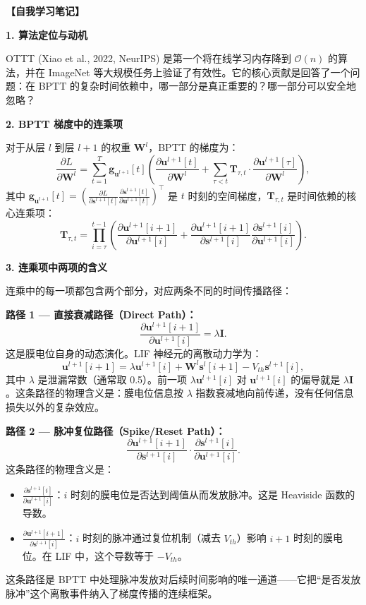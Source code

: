 \documentclass[journal,12pt,onecolumn]{IEEEtran}
\begin{document}
\bigskip\noindent\textbf{【自我学习笔记】}

\medskip\noindent\textbf{1. 算法定位与动机}

OTTT (Xiao et al., 2022, NeurIPS) 是第一个将在线学习内存降到 $\mathcal{O}(n)$ 的算法，并在 ImageNet 等大规模任务上验证了有效性。它的核心贡献是回答了一个问题：在 BPTT 的复杂时间依赖中，哪一部分是真正重要的？哪一部分可以安全地忽略？

\medskip\noindent\textbf{2. BPTT 梯度中的连乘项}

对于从层 $l$ 到层 $l+1$ 的权重 $\mathbf{W}^l$，BPTT 的梯度为：
\begin{equation}
    \frac{\partial L}{\partial \mathbf{W}^l} = \sum_{t=1}^T \mathbf{g}_{\mathbf{u}^{l+1}}[t] \left( \frac{\partial \mathbf{u}^{l+1}[t]}{\partial \mathbf{W}^l} + \sum_{\tau < t} \mathbf{T}_{\tau,t} \cdot \frac{\partial \mathbf{u}^{l+1}[\tau]}{\partial \mathbf{W}^l} \right), \tag{3}
\end{equation}
其中 $\mathbf{g}_{\mathbf{u}^{l+1}}[t] = \left( \frac{\partial L}{\partial \mathbf{s}^{l+1}[t]} \frac{\partial \mathbf{s}^{l+1}[t]}{\partial \mathbf{u}^{l+1}[t]} \right)^\top$ 是 $t$ 时刻的空间梯度，$\mathbf{T}_{\tau,t}$ 是时间依赖的核心连乘项：
\begin{equation}
    \mathbf{T}_{\tau,t} = \prod_{i=\tau}^{t-1} \left( \frac{\partial \mathbf{u}^{l+1}[i+1]}{\partial \mathbf{u}^{l+1}[i]} + \frac{\partial \mathbf{u}^{l+1}[i+1]}{\partial \mathbf{s}^{l+1}[i]} \frac{\partial \mathbf{s}^{l+1}[i]}{\partial \mathbf{u}^{l+1}[i]} \right). \tag{4}
\end{equation}

\medskip\noindent\textbf{3. 连乘项中两项的含义}

连乘中的每一项都包含两个部分，对应两条不同的时间传播路径：

\textbf{路径 1 — 直接衰减路径（Direct Path）：}
\[
\frac{\partial \mathbf{u}^{l+1}[i+1]}{\partial \mathbf{u}^{l+1}[i]} = \lambda \mathbf{I}.
\]
这是膜电位自身的动态演化。LIF 神经元的离散动力学为：
\[
\mathbf{u}^{l+1}[i+1] = \lambda \mathbf{u}^{l+1}[i] + \mathbf{W}^l \mathbf{s}^l[i+1] - V_{th}\mathbf{s}^{l+1}[i],
\]
其中 $\lambda$ 是泄漏常数（通常取 0.5）。前一项 $\lambda \mathbf{u}^{l+1}[i]$ 对 $\mathbf{u}^{l+1}[i]$ 的偏导就是 $\lambda \mathbf{I}$。这条路径的物理含义是：膜电位信息按 $\lambda$ 指数衰减地向前传递，没有任何信息损失以外的复杂效应。

\textbf{路径 2 — 脉冲复位路径（Spike/Reset Path）：}
\[
\frac{\partial \mathbf{u}^{l+1}[i+1]}{\partial \mathbf{s}^{l+1}[i]} \cdot \frac{\partial \mathbf{s}^{l+1}[i]}{\partial \mathbf{u}^{l+1}[i]}.
\]
这条路径的物理含义是：
\begin{itemize}
    \item $\frac{\partial \mathbf{s}^{l+1}[i]}{\partial \mathbf{u}^{l+1}[i]}$：$i$ 时刻的膜电位是否达到阈值从而发放脉冲。这是 Heaviside 函数的导数。
    \item $\frac{\partial \mathbf{u}^{l+1}[i+1]}{\partial \mathbf{s}^{l+1}[i]}$：$i$ 时刻的脉冲通过复位机制（减去 $V_{th}$）影响 $i+1$ 时刻的膜电位。在 LIF 中，这个导数等于 $-V_{th}$。
\end{itemize}
这条路径是 BPTT 中处理脉冲发放对后续时间影响的唯一通道——它把“是否发放脉冲”这个离散事件纳入了梯度传播的连续框架。
\end{document}
